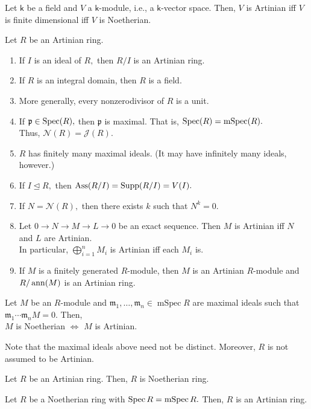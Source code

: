 \documentclass[12pt]{article}	%
\DeclareMathOperator{\mSpec}{mSpec}
\begin{document}
\begin{prop}
	Let $\mathsf{k}$ be a field and $V$ a $\mathsf{k}$-module, i.e., a $\mathsf{k}$-vector space. Then, $V$ is Artinian iff $V$ is finite dimensional iff $V$ is Noetherian.
\end{prop}

\begin{prop}
	Let $R$ be an Artinian ring.
	\begin{enumerate}
		\item If $I$ is an ideal of $R,$ then $R/I$ is an Artinian ring.
		\item If $R$ is an integral domain, then $R$ is a field.
		\item More generally, every nonzerodivisor of $R$ is a unit.
		\item If $\mathfrak{p} \in \operatorname{Spec}(R),$ then $\mathfrak{p}$ is maximal. That is, $\Spec(R) = \mSpec(R).$ \\
		Thus, $\mathcal{N}(R) = \mathcal{J}(R).$
		\item $R$ has finitely many maximal ideals. (It may have infinitely many ideals, however.)
		\item If $I \unlhd R,$ then $\operatorname{Ass}(R/I) = \operatorname{Supp}(R/I) = V(I).$
		\item If $N = \mathcal{N}(R),$ then there exists $k$ such that $N^k = 0.$
		\item Let $0 \to N \to M \to L \to 0$ be an exact sequence. Then $M$ is Artinian iff $N$ and $L$ are Artinian.\\
		In particular, $\bigoplus_{i = 1}^n M_i$ is Artinian iff each $M_i$ is.
		\item If $M$ is a finitely generated $R$-module, then $M$ is an Artinian $R$-module and $R/\operatorname{ann}(M)$ is an Artinian ring.
	\end{enumerate}
\end{prop}

\begin{prop}
	Let $M$ be an $R$-module and $\mathfrak{m}_1, \ldots, \mathfrak{m}_n \in \mSpec R$ are maximal ideals such that $\mathfrak{m}_1\cdots\mathfrak{m}_nM = 0.$ Then,\\
	$M$ is Noetherian $\Leftrightarrow$ $M$ is Artinian.
\end{prop}
Note that the maximal ideals above need not be distinct. Moreover, $R$ is not assumed to be Artinian.

\begin{prop}
	Let $R$ be an Artinian ring. Then, $R$ is Noetherian ring.
\end{prop}
\begin{prop}
	Let $R$ be a Noetherian ring with $\Spec R = \mSpec R.$ Then, $R$ is an Artinian ring.
\end{prop}
\end{document}
